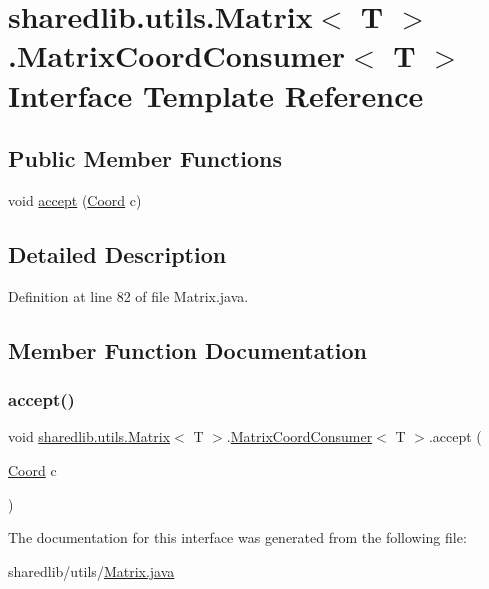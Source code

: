 \hypertarget{interfacesharedlib_1_1utils_1_1_matrix_1_1_matrix_coord_consumer}{}\section{sharedlib.\+utils.\+Matrix$<$ T $>$.Matrix\+Coord\+Consumer$<$ T $>$ Interface Template Reference}
\label{interfacesharedlib_1_1utils_1_1_matrix_1_1_matrix_coord_consumer}
\subsection*{Public Member Functions}
\begin{DoxyCompactItemize}
\item 
void \hyperlink{interfacesharedlib_1_1utils_1_1_matrix_1_1_matrix_coord_consumer_a16946d8d8a6faefcc39424687398d226}{accept} (\hyperlink{classsharedlib_1_1utils_1_1_coord}{Coord} c)
\end{DoxyCompactItemize}


\subsection{Detailed Description}


Definition at line 82 of file Matrix.\+java.



\subsection{Member Function Documentation}
\hypertarget{interfacesharedlib_1_1utils_1_1_matrix_1_1_matrix_coord_consumer_a16946d8d8a6faefcc39424687398d226}{}\label{interfacesharedlib_1_1utils_1_1_matrix_1_1_matrix_coord_consumer_a16946d8d8a6faefcc39424687398d226} 
\subsubsection{\texorpdfstring{accept()}{accept()}}
{\footnotesize\ttfamily void \hyperlink{classsharedlib_1_1utils_1_1_matrix}{sharedlib.\+utils.\+Matrix}$<$ T $>$.\hyperlink{interfacesharedlib_1_1utils_1_1_matrix_1_1_matrix_coord_consumer}{Matrix\+Coord\+Consumer}$<$ T $>$.accept (\begin{DoxyParamCaption}\item[{\hyperlink{classsharedlib_1_1utils_1_1_coord}{Coord}}]{c }\end{DoxyParamCaption})}



The documentation for this interface was generated from the following file\+:\begin{DoxyCompactItemize}
\item 
sharedlib/utils/\hyperlink{_matrix_8java}{Matrix.\+java}\end{DoxyCompactItemize}
